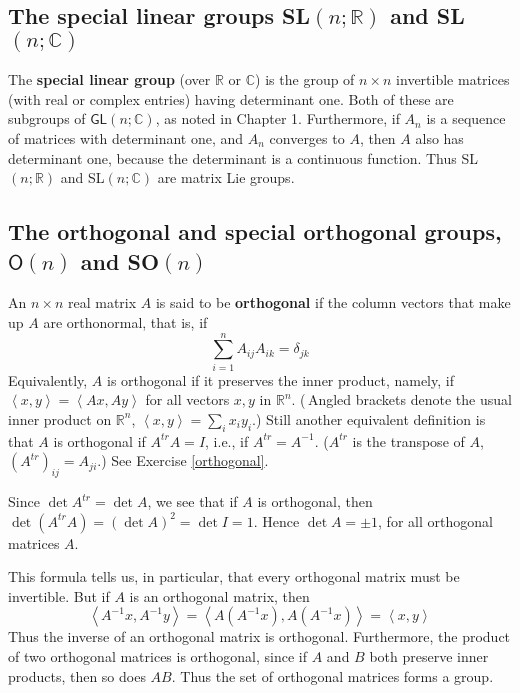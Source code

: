 \documentclass[12pt]{amsbook}
\theoremstyle{plain}
\numberwithin{equation}{chapter}
\numberwithin{theorem}{chapter}
\begin{document}
\subsection{The special linear groups \textsf{SL}$\left(  n;\mathbb{R}\right)
$ and \textsf{SL}$\left(  n;\mathbb{C}\right)  $}

The \textbf{special linear group} (over $\mathbb{R}$ or $\mathbb{C}$) is the
group of $n\times n$ invertible matrices (with real or complex entries) having
determinant one. Both of these are subgroups of $\mathsf{GL}(n;\mathbb{C})$,
as noted in Chapter 1. Furthermore, if $A_{n}$ is a sequence of matrices with
determinant one, and $A_{n}$ converges to $A$, then $A$ also has determinant
one, because the determinant is a continuous function. Thus \textsf{SL}%
$\left(  n;\mathbb{R}\right)  $ and \textsf{SL}$\left(  n;\mathbb{C}\right)  $
are matrix Lie groups.

\subsection{The orthogonal and special orthogonal groups, $\mathsf{O}(n)$ and
\textsf{SO}$(n)$}

An $n\times n$ real matrix $A$ is said to be \textbf{orthogonal} if the column
vectors that make up $A$ are orthonormal, that is, if
\[
\sum_{i=1}^{n}A_{ij}A_{ik}=\delta_{jk}%
\]
Equivalently, $A$ is orthogonal if it preserves the inner product, namely, if
$\left\langle x,y\right\rangle =\left\langle Ax,Ay\right\rangle $ for all
vectors $x,y$ in $\mathbb{R}^{n}$. ($\,$Angled brackets denote the usual inner
product on $\mathbb{R}^{n}$, $\left\langle x,y\right\rangle =\sum_{i}%
x_{i}y_{i}$.) Still another equivalent definition is that $A$ is orthogonal if
$A^{tr}A=I$, i.e., if $A^{tr}=A^{-1}$. ($A^{tr}$ is the transpose of $A$,
$\left(  A^{tr}\right)  _{ij}=A_{ji}$.) See Exercise \ref{orthogonal}.

Since $\det A^{tr}=\det A$, we see that if $A$ is orthogonal, then
$\det(A^{tr}A)=\left(  \det A\right)  ^{2}=\det I=1$. Hence $\det A=\pm1$, for
all orthogonal matrices $A$.

This formula tells us, in particular, that every orthogonal matrix must be
invertible. But if $A$ is an orthogonal matrix, then
\[
\left\langle A^{-1}x,A^{-1}y\right\rangle =\left\langle A\left(
A^{-1}x\right)  ,A\left(  A^{-1}x\right)  \right\rangle =\left\langle
x,y\right\rangle
\]
Thus the inverse of an orthogonal matrix is orthogonal. Furthermore, the
product of two orthogonal matrices is orthogonal, since if $A$ and $B$ both
preserve inner products, then so does $AB$. Thus the set of orthogonal
matrices forms a group.
\end{document}
